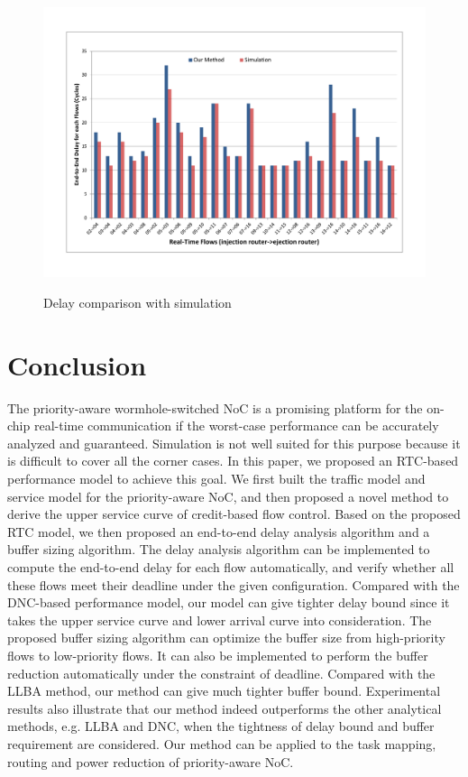 \documentclass[preprint]{elsarticle}
\begin{document}
\begin{figure}
  \centering
  \includegraphics[scale=0.45]{fig12.pdf}\\
  \caption{Delay comparison with simulation}\label{ericsson}
\end{figure}

\section{Conclusion}\label{conclusion}
The priority-aware wormhole-switched NoC is a promising platform for the on-chip real-time communication if the worst-case performance can be accurately analyzed and guaranteed. Simulation is not well suited for this purpose because it is difficult to cover all the corner cases. In this paper, we proposed an RTC-based performance model to achieve this goal. We first built the traffic model and service model for the priority-aware NoC, and then proposed a novel method to derive the upper service curve of credit-based flow control. Based on the proposed RTC model, we then proposed an end-to-end delay analysis algorithm and a buffer sizing algorithm. The delay analysis algorithm can be implemented to compute the end-to-end delay for each flow automatically, and verify whether all these flows meet their deadline under the given configuration. Compared with the DNC-based performance model, our model can give tighter delay bound since it takes the upper service curve and lower arrival curve into consideration. The proposed buffer sizing algorithm can optimize the buffer size from high-priority flows to low-priority flows. It can also be implemented to perform the buffer reduction automatically under the constraint of deadline. Compared with the LLBA method, our method can give much tighter buffer bound. Experimental results also illustrate that our method indeed outperforms the other analytical methods, e.g. LLBA and DNC, when the tightness of delay bound and buffer requirement are considered. Our method can be applied to the task mapping, routing and power reduction of priority-aware NoC.
\end{document}
